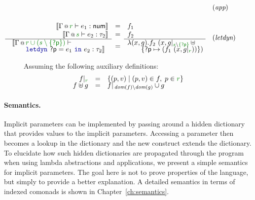 \begin{figure}[t]
\begin{equation*}
\begin{array}{ll}
& (\emph{app})
\\[1.5em]
\hspace{-3.3em}\emdefff
  {\coctx{\Gamma}{\cclrd{r}} \vdash e_1 : \ident{num}}
  {\coctx{\Gamma}{\cclrd{s}} \vdash e_2 : \tau_2}
  {\begin{array}{l}\sem{\coctx{\Gamma}{\cclrd{r \cup (s \setminus \{ \ident{?p} \})}} \vdash\\[-0.25em]
    \qquad\kvd{letdyn}~\ident{?p}=e_1~\kvd{in}~e_2 : \tau_2}\end{array}}
  {f_1}
  {f_2}
  {\hspace{-0.5em}\begin{array}{l}
  \lambda (x, g) . f_2~(x, \restr{g}{\cclrd{s} \setminus \cclrd{\{ \ident{?p} \}}} \,\uplus \\[-0.25em]
    \qquad \{ \ident{?p} \mapsto (f_1~(x, \restr{g}{\cclrd{r}})) \} )
  \end{array}\hspace{-1em}~}
& (\emph{letdyn})
\end{array}
\end{equation*}

\vspace{1em}
Assuming the following auxiliary definitions:
\begin{equation*}
\begin{array}{rcl}
 \restr{f}{\cclrd{r}} &=& \{ (p,v) \;|\; (p,v) \in f, \;p \in \cclrd{r} \}\\[-0.25em]
 f \uplus g &=& \restr{f}{\, \textit{dom}(f) \setminus \textit{dom}(g)} \cup g
\end{array}
\end{equation*}

\label{fig:applications-flat-implsem}
\vspace{-0.5em}
\end{figure}


\paragraph{Semantics.}
Implicit parameters can be implemented by passing around a hidden dictionary that provides values
to the implicit parameters. Accessing a parameter then becomes a lookup in the dictionary and
the new  construct extends the dictionary. To elucidate how such hidden dictionaries
are propagated through the program when using lambda abstractions and applications, we present a
simple semantics for implicit parameters. The goal here is not to prove properties of the language,
but simply to provide a better explanation. A detailed semantics in terms of indexed comonads is
shown in Chapter~\ref{ch:semantics}.

